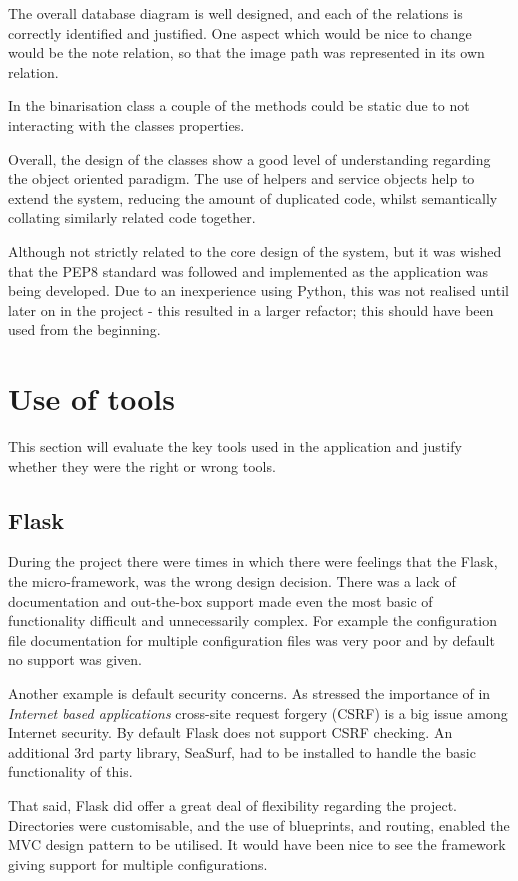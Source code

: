 The overall database diagram is well designed, and each of the relations is correctly identified and justified. One aspect which would be nice to change would be the note relation, so that the image path was represented in its own relation.

In the binarisation class a couple of the methods could be static due to not interacting with the classes properties.

Overall, the design of the classes show a good level of understanding regarding the object oriented paradigm. The use of helpers and service objects help to extend the system, reducing the amount of duplicated code, whilst semantically collating similarly related code together.

Although not strictly related to the core design of the system, but it was wished that the PEP8 \cite{citeulike:1402014} standard was followed and implemented as the application was being developed. Due to an inexperience using Python, this was not realised until later on in the project - this resulted in a larger refactor; this should have been used from the beginning.

\section{Use of tools}
This section will evaluate the key tools used in the application and justify whether they were the right or wrong tools.
\subsection{Flask}
During the project there were times in which there were feelings that the  Flask, the micro-framework,  was the wrong design decision. There was a lack of documentation and out-the-box support made even the most basic of functionality difficult and unnecessarily complex. For example the configuration file documentation for multiple configuration files was very poor and by default no support was given.

Another example is default security concerns. As stressed the importance of in \textit{Internet based applications} cross-site request forgery (CSRF) is a big issue among Internet security. By default Flask does not support CSRF checking. An additional 3rd party library, SeaSurf, had to be installed to handle the basic functionality of this.

That said, Flask did offer a great deal of flexibility regarding the project. Directories were customisable, and the use of blueprints, and routing, enabled the MVC design pattern to be utilised. It would have been nice to see the framework giving support for multiple configurations.

